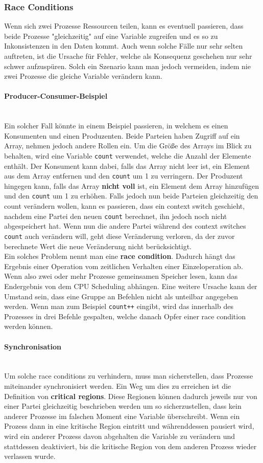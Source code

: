 \documentclass{article}
\newcommand{\paragraphlb}[1]{\paragraph{#1}\mbox{}\\}
\begin{document}
	 \subsubsection{Race Conditions}
	 Wenn sich zwei Prozesse Ressourcen teilen, kann es eventuell passieren, dass beide Prozesse "gleichzeitig" auf eine Variable zugreifen und es so zu Inkonsistenzen in den Daten kommt. Auch wenn solche Fälle nur sehr selten auftreten, ist die Ursache für Fehler, welche als Konsequenz geschehen nur sehr schwer aufzuspüren. Solch ein Szenario kann man jedoch vermeiden, indem nie zwei Prozesse die gleiche Variable verändern kann. \\
	 \paragraphlb{Producer-Consumer-Beispiel}
	 Ein solcher Fall könnte in einem Beispiel passieren, in welchem es einen Konsumenten und einen Produzenten. Beide Parteien haben Zugriff auf ein Array, nehmen jedoch andere Rollen ein. Um die Größe des Arrays im Blick zu behalten, wird eine Variable \verb|count|  verwendet, welche die Anzahl der Elemente enthält. Der Konsument kann dabei, falls das Array nicht leer ist, ein Element aus dem Array entfernen und den \verb|count| um 1 zu verringern. Der Produzent hingegen kann, falls das Array \textbf{nicht voll} ist, ein Element dem Array hinzufügen und den \verb|count| um 1 zu erhöhen. Falls jedoch nun beide Parteien gleichzeitig den count verändern wollen, kann es passieren, dass ein context switch geschieht, nachdem eine Partei den neuen \verb|count| berechnet, ihn jedoch noch nicht abgespeichert hat. Wenn nun die andere Partei während des context switches \verb|count| auch verändern will, geht diese Veränderung verloren, da der zuvor berechnete Wert die neue Veränderung nicht berücksichtigt. \\
	 Ein solches Problem nennt man eine \textbf{race condition}. Dadurch hängt das Ergebnis einer Operation vom zeitlichen Verhalten einer Einzeloperation ab. Wenn also zwei oder mehr Prozesse gemeinsamen Speicher lesen, kann das Endergebnis von dem CPU Scheduling abhängen. Eine weitere Ursache kann der Umstand sein, dass eine Gruppe an Befehlen nicht als unteilbar angegeben werden. Wenn man zum Beispiel \verb|count++| eingibt, wird das innerhalb des Prozesses in drei Befehle gespalten, welche danach Opfer einer race condition werden können. 
	 \paragraphlb{Synchronisation}
	 Um solche race conditions zu verhindern, muss man sicherstellen, dass Prozesse miteinander synchronisiert werden. Ein Weg um dies zu erreichen ist die Definition von \textbf{critical regions}. Diese Regionen können dadurch jeweils nur von einer Partei gleichzeitig beschrieben werden um so sicherzustellen, dass kein anderer Prozesse im falschen Moment eine Variable überschreibt. Wenn ein Prozess dann in eine kritische Region eintritt und währenddessen pausiert wird, wird ein anderer Prozess davon abgehalten die Variable zu verändern und stattdessen deaktiviert, bis die kritische Region von dem anderen Prozess wieder verlassen wurde.\\
\end{document}
